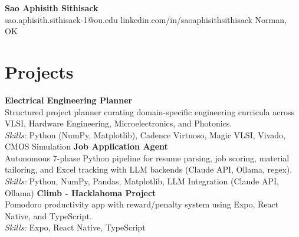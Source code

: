 \documentclass[11pt,letterpaper]{article}
\begin{document}
\begin{center}
{\LARGE \textbf{Sao Aphisith Sithisack}}\\[2pt]
\small sao.aphisith.sithisack-1@ou.edu \textbullet{} linkedin.com/in/saoaphisithsithisack \textbullet{} Norman, OK
\end{center}
\section*{Projects}
\noindent\textbf{Electrical Engineering Planner}\\
Structured project planner curating domain-specific engineering curricula across VLSI, Hardware Engineering, Microelectronics, and Photonics.\\
\textit{Skills:} Python (NumPy, Matplotlib), Cadence Virtuoso, Magic VLSI, Vivado, CMOS Simulation
\noindent\textbf{Job Application Agent}\\
Autonomous 7-phase Python pipeline for resume parsing, job scoring, material tailoring, and Excel tracking with LLM backends (Claude API, Ollama, regex).\\
\textit{Skills:} Python, NumPy, Pandas, Matplotlib, LLM Integration (Claude API, Ollama)
\noindent\textbf{Climb - Hacklahoma Project}\\
Pomodoro productivity app with reward/penalty system using Expo, React Native, and TypeScript.\\
\textit{Skills:} Expo, React Native, TypeScript
\end{document}
